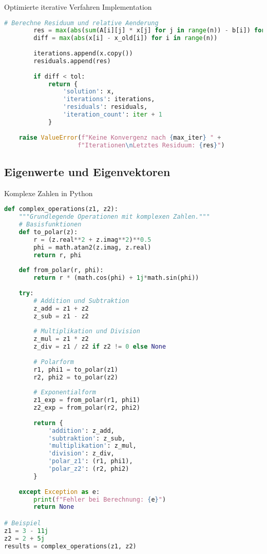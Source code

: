 \begin{examplecode}{Optimierte iterative Verfahren Implementation}
\begin{lstlisting}[language=Python, style=basesmol]
        # Berechne Residuum und relative Aenderung
        res = max(abs(sum(A[i][j] * x[j] for j in range(n)) - b[i]) for i in range(n))
        diff = max(abs(x[i] - x_old[i]) for i in range(n))
        
        iterations.append(x.copy())
        residuals.append(res)
        
        if diff < tol:
            return {
                'solution': x,
                'iterations': iterations,
                'residuals': residuals,
                'iteration_count': iter + 1
            }
            
    raise ValueError(f"Keine Konvergenz nach {max_iter} " + 
                    f"Iterationen\nLetztes Residuum: {res}")
\end{lstlisting}
\end{examplecode}

\subsection{Eigenwerte und Eigenvektoren}

\begin{examplecode}{Komplexe Zahlen in Python}
\begin{lstlisting}[language=Python, style=basesmol]
def complex_operations(z1, z2):
    """Grundlegende Operationen mit komplexen Zahlen."""
    # Basisfunktionen
    def to_polar(z):
        r = (z.real**2 + z.imag**2)**0.5
        phi = math.atan2(z.imag, z.real)
        return r, phi
    
    def from_polar(r, phi):
        return r * (math.cos(phi) + 1j*math.sin(phi))
    
    try:
        # Addition und Subtraktion
        z_add = z1 + z2
        z_sub = z1 - z2
        
        # Multiplikation und Division
        z_mul = z1 * z2
        z_div = z1 / z2 if z2 != 0 else None
        
        # Polarform
        r1, phi1 = to_polar(z1)
        r2, phi2 = to_polar(z2)
        
        # Exponentialform
        z1_exp = from_polar(r1, phi1)
        z2_exp = from_polar(r2, phi2)
        
        return {
            'addition': z_add,
            'subtraktion': z_sub,
            'multiplikation': z_mul,
            'division': z_div,
            'polar_z1': (r1, phi1),
            'polar_z2': (r2, phi2)
        }
        
    except Exception as e:
        print(f"Fehler bei Berechnung: {e}")
        return None

# Beispiel
z1 = 3 - 11j
z2 = 2 + 5j
results = complex_operations(z1, z2)
\end{lstlisting}
\end{examplecode}

